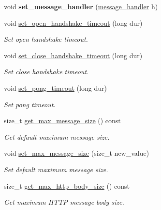 \begin{DoxyCompactItemize}
\mbox{\label{classwebsocketpp_1_1endpoint_a34a3a8351bff65ba878975be471cab85}} 
void {\bfseries set\+\_\+message\+\_\+handler} (\mbox{\hyperlink{classwebsocketpp_1_1endpoint_afa2109f793a8d8d90599ea339bbcd8e5}{message\+\_\+handler}} h)
\item 
void \mbox{\hyperlink{classwebsocketpp_1_1endpoint_adb8b3736e30bb8e5ee6add965a948102}{set\+\_\+open\+\_\+handshake\+\_\+timeout}} (long dur)
\begin{DoxyCompactList}\small\item\em Set open handshake timeout. \end{DoxyCompactList}\item 
void \mbox{\hyperlink{classwebsocketpp_1_1endpoint_a54caf799e1cf531d26f67999068d483b}{set\+\_\+close\+\_\+handshake\+\_\+timeout}} (long dur)
\begin{DoxyCompactList}\small\item\em Set close handshake timeout. \end{DoxyCompactList}\item 
void \mbox{\hyperlink{classwebsocketpp_1_1endpoint_abcb25dde6f71933c3dbe517c45ebe5c6}{set\+\_\+pong\+\_\+timeout}} (long dur)
\begin{DoxyCompactList}\small\item\em Set pong timeout. \end{DoxyCompactList}\item 
size\+\_\+t \mbox{\hyperlink{classwebsocketpp_1_1endpoint_a67d0a1ac6e9a332a485f569e71f85882}{get\+\_\+max\+\_\+message\+\_\+size}} () const
\begin{DoxyCompactList}\small\item\em Get default maximum message size. \end{DoxyCompactList}\item 
void \mbox{\hyperlink{classwebsocketpp_1_1endpoint_a6268a63c9ce030941fcfb32ddabf3090}{set\+\_\+max\+\_\+message\+\_\+size}} (size\+\_\+t new\+\_\+value)
\begin{DoxyCompactList}\small\item\em Set default maximum message size. \end{DoxyCompactList}\item 
size\+\_\+t \mbox{\hyperlink{classwebsocketpp_1_1endpoint_ace4f1bdfdf20c13557b34c35c10ca554}{get\+\_\+max\+\_\+http\+\_\+body\+\_\+size}} () const
\begin{DoxyCompactList}\small\item\em Get maximum H\+T\+TP message body size. \end{DoxyCompactList}\item 

\end{DoxyCompactItemize}
